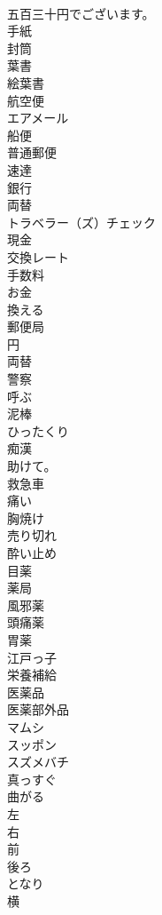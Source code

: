 \documentclass[8pt]{extreport}
\begin{document}
\begin{CJK}{UTF8}{min}
\\	五百三十円でございます。 
\\	手紙
\\	封筒
\\	葉書
\\	絵葉書
\\	航空便
\\	エアメール
\\	船便
\\	普通郵便
\\	速達
\\	銀行
\\	両替
\\	トラベラー（ズ）チェック
\\	現金
\\	交換レート
\\	手数料
\\	お金
\\	換える
\\	郵便局
\\	円
\\	両替
\\	警察
\\	呼ぶ
\\	泥棒
\\	ひったくり
\\	痴漢
\\	助けて。
\\	救急車
\\	痛い
\\	胸焼け
\\	売り切れ
\\	酔い止め
\\	目薬
\\	薬局
\\	風邪薬
\\	頭痛薬
\\	胃薬
\\	江戸っ子
\\	栄養補給
\\	医薬品
\\	医薬部外品
\\	マムシ
\\	スッポン
\\	スズメバチ
\\	真っすぐ
\\	曲がる
\\	左
\\	右
\\	前
\\	後ろ
\\	となり
\\	横

\end{CJK}
\end{document}
